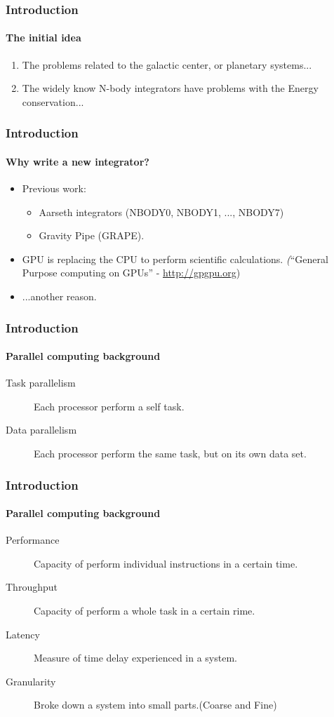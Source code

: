 \begin{frame}
    \frametitle{Introduction}
    \framesubtitle{The initial idea}
    \begin{enumerate}
        \item The problems related to the galactic center,
              or planetary systems...
        \item The widely know N-body integrators have problems
              with the Energy conservation...
    \end{enumerate}
\end{frame}

\begin{frame}
    \frametitle{Introduction}
    \framesubtitle{Why write a new integrator?}
    \begin{itemize}
            \item Previous work:
            \begin{itemize}
                \item Aarseth integrators (NBODY0, NBODY1, ..., NBODY7)
                \item Gravity Pipe (GRAPE).
            \end{itemize}
            \item GPU is replacing the CPU to perform scientific calculations.
                 \emph(``General Purpose computing on GPUs'' - \url{http://gpgpu.org})
            \item ...another reason.
    \end{itemize}
\end{frame}

\begin{frame}
    \frametitle{Introduction}
    \framesubtitle{Parallel computing background}
    \begin{description}
        \item[Task parallelism]
            Each processor perform a self task.
        \item[Data parallelism]
            Each processor perform the same task, but on its own data set.
    \end{description}
\end{frame}

\begin{frame}
    \frametitle{Introduction}
    \framesubtitle{Parallel computing background}
    \begin{description}
        \item[Performance]
                Capacity of perform individual instructions in a certain time.
        \item[Throughput]
                Capacity of perform a whole task in a certain rime.
        \item[Latency]
                Measure of time delay experienced in a system.
        \item[Granularity]
                Broke down a system into small parts.(Coarse and Fine)
    \end{description}
\end{frame}

